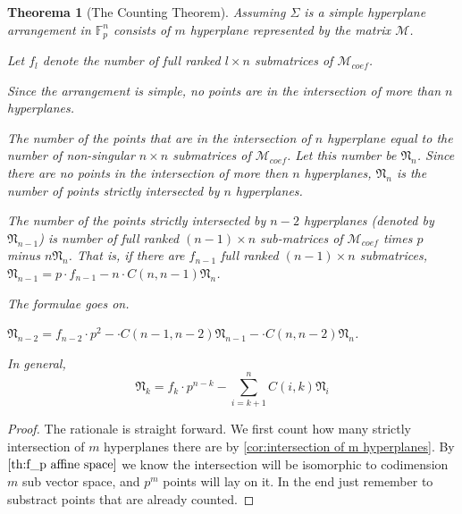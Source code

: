 \documentclass[12pt, a4paper]{article}
\newtheorem{theorem}{Theorema}[subsection]
\theoremstyle{definition}
\theoremstyle{remark}
\begin{document}
\begin{theorem}[The Counting Theorem]
	Assuming $\Sigma$ is a simple hyperplane arrangement in $\mathbb{F}_p^n$ consists of $m$ hyperplane represented by the matrix $\mathcal{M}$. 

	Let $f_{l}$ denote the number of full ranked $l \times n
	$ submatrices of $\mathcal{M}_{coef}$.

	Since the arrangement is simple, no points are in the intersection of more than $n$ hyperplanes. 

	The number of the points that are in the intersection of $n$ hyperplane equal to the number of non-singular $n \times n$ submatrices of $\mathcal{M}_{coef}$. Let this number be $\mathfrak{N}_n$. Since there are no points in the intersection of more then $n$ hyperplanes, $\mathfrak{N}_n$ is the number of points strictly intersected by $n$ hyperplanes. 

	The number of the points strictly intersected by $n-2$ hyperplanes (denoted by $\mathfrak{N}_{n-1}$) is number of full ranked $(n-1) \times n$ sub-matrices of $\mathcal{M}_{coef}$ times $p$ minus  $n\mathfrak{N}_{n}$. That is, if there are $f_{n-1}$ full ranked $(n-1) \times n$ submatrices, $\mathfrak{N}_{n-1} = p \cdot f_{n-1} - n \cdot C(n, n-1) \mathfrak{N}_n$.

	The formulae goes on.

	$\mathfrak{N}_{n-2} = f_{n-2} \cdot p^2 -  \cdot C(n-1, n-2) \mathfrak{N}_{n-1} - \cdot C(n, n-2) \mathfrak{N}_{n}$.

	In general, 
	\begin{equation}
		\mathfrak{N}_{k} = f_{k} \cdot p^{n-k} - \sum_{i = k+1}^{n} C(i, k) \mathfrak{N}_{i}
	\end{equation}
\end{theorem}

\begin{proof}
	The rationale is straight forward. 
	We first count how many strictly intersection of $m$ hyperplanes there are by \ref{cor:intersection of m hyperplanes}. 
	By $\ref{th:f_p affine space}$ we know the intersection will be isomorphic to codimension $m$ sub vector space, and $p^m$ points will lay on it. In the end just remember to substract points that are already counted.
\end{proof}
\end{document}

